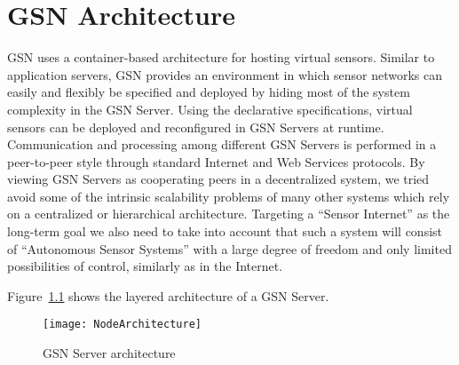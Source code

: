 \graphicspath{{chapters/ch-architecture/figures/}}

\chapter{GSN Architecture}



\label{sec:system-architecture}

GSN uses a container-based architecture for hosting virtual sensors.
Similar to application servers, GSN provides an environment in which
sensor networks can easily and flexibly be specified and deployed by
hiding most of the system complexity in the GSN Server.  Using the
declarative specifications, virtual sensors can be deployed and
reconfigured in GSN Servers at runtime. Communication and
processing among different GSN Servers is performed in a
peer-to-peer style through standard Internet and Web Services protocols. By
viewing GSN Servers as cooperating peers in a decentralized system,
we tried avoid some of the intrinsic scalability problems of many
other systems which rely on a centralized or hierarchical
architecture. Targeting a ``Sensor Internet'' as the long-term goal we
also need to take into account that such a system will consist of
``Autonomous Sensor Systems'' with a large degree of freedom and only
limited possibilities of control, similarly as in the Internet.

Figure~\ref{fig:NodeArchitecture} shows the layered architecture of a
GSN Server.

\begin{figure}%
  \centering
  \texttt{[image: NodeArchitecture]}
  \caption{GSN Server architecture}
  \label{fig:NodeArchitecture}
\end{figure}

